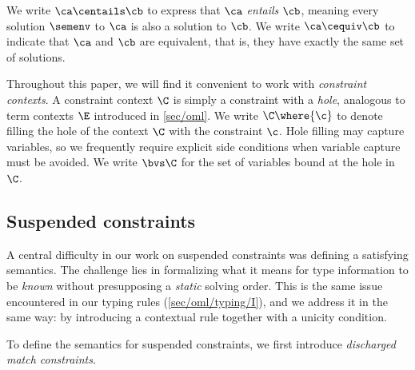 \documentclass[acmsmall,screen,nonacm%
\Anonymous{,anonymous}{}%
\Final{}{,review}%
]{acmart}
\begin{document}

We write $\ca \centails \cb$ to express that $\ca$ \emph{entails} $\cb$,
meaning every solution $\semenv$ to $\ca$ is also a solution to $\cb$.
We write $\ca \cequiv \cb$ to indicate that $\ca$ and $\cb$ are equivalent,
that is, they have exactly the same set of solutions.


Throughout this paper, we will find it convenient to work with \emph{constraint
contexts}. A constraint context $\C$ is simply a constraint with a \emph{hole},
analogous to term contexts $\E$ introduced in \cref{sec/oml}. We write
$\C\where{\c}$ to denote filling the hole of the context $\C$ with the
constraint $\c$. Hole filling may capture variables, so we frequently require
explicit side conditions when variable capture must be avoided. We write $\bvs
\C$ for the set of variables bound at the hole in $\C$.

\subsection{Suspended constraints}
\label{sec/constraints/semantics}


A central difficulty in our work on suspended constraints was defining a
satisfying semantics. The challenge lies in formalizing what it means for type
information to be \emph{known} without presupposing a \emph{static} solving
order. This is the same issue encountered in our typing rules
(\cref{sec/oml/typing/I}), and we address it in the same way: by introducing a
contextual rule together with a unicity condition.

To define the semantics for suspended constraints, we first introduce
\emph{discharged match constraints}.
\end{document}
